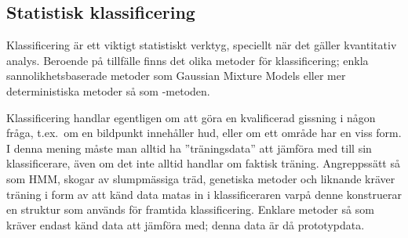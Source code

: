 \documentclass[../rapport_MVEX01-11-05]{subfiles}
\begin{document}
\subsection{Statistisk klassificering}\label{sec:klassificering}

Klassificering är ett viktigt statistiskt verktyg, speciellt när det gäller
kvantitativ analys. Beroende på tillfälle finns det olika metoder för
klassificering; enkla sannolikhetsbaserade metoder som Gaussian Mixture
Models eller mer deterministiska metoder så som \knn-metoden.

Klassificering handlar egentligen om att göra en kvalificerad gissning
i någon fråga, t.ex.~om en bildpunkt innehåller hud, eller om ett område har
en viss form. I denna mening måste man alltid ha ''träningsdata'' att jämföra med
till sin
klassificerare, även om det inte alltid handlar om faktisk träning. Angreppssätt
så som HMM, skogar av slumpmässiga träd, genetiska metoder och liknande kräver
träning i form av att känd data matas in i klassificeraren varpå denne
konstruerar en struktur som används för framtida klassificering.
Enklare metoder så som \knn 
kräver endast känd data att jämföra med; denna data är då prototypdata.

\end{document}
